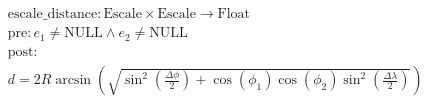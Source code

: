 \[
\begin{aligned}
&\text{escale\_distance}: \text{Escale} \times \text{Escale} \to \text{Float} \\
&\text{pre}: e_1 \neq \text{NULL} \land e_2 \neq \text{NULL} \\
&\text{post}: \\
&d = 2R \arcsin \left( \sqrt{\sin^2 \left(\frac{\Delta \phi}{2}\right) + \cos(\phi_1) \cos(\phi_2) \sin^2 \left(\frac{\Delta \lambda}{2}\right)} \right)
\end{aligned}
\]



